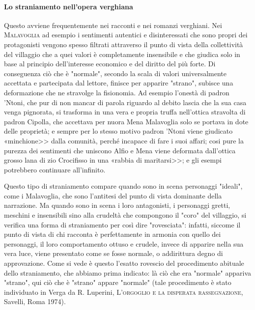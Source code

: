 \documentclass{book}
\newcounter{mar}
\begin{document}
\paragraph{Lo straniamento nell'opera verghiana} Questo avviene frequentemente nei racconti e nei romanzi verghiani. Nei \textsc{Malavoglia} ad esempio i sentimenti autentici e disinteressati che sono propri dei protagonisti vengono spesso filtrati attraverso il punto di vista della collettività del villaggio che a quei valori è completamente insensibile e che giudica solo in base al principio dell'interesse economico e del diritto del più forte. Di conseguenza ciò che è "normale", secondo la scala di valori universalmente accettata e partecipata dal lettore, finisce per apparire "strano", subisce una deformazione che ne stravolge la fisionomia. Ad esempio l'onestà di padron 'Ntoni, che pur di non mancar di parola riguardo al debito lascia che la sua casa venga pignorata, si trasforma in una vera e propria truffa nell'ottica stravolta di padron Cipolla, che accettava per nuora Mena Malavoglia solo se portava in dote delle proprietà; e sempre per lo stesso motivo padron 'Ntoni viene giudicato «minchione>> dalla comunità, perché incapace di fare i suoi affari; cosi pure la purezza dei sentimenti che uniscono Alfio e Mena viene deformata dall'ottica grosso lana di zio Crocifisso in una «rabbia di maritarsi>>; e gli esempi potrebbero continuare all'infinito.

Questo tipo di straniamento compare quando sono in scena personaggi "ideali", come i Malavoglia, che sono l'antitesi del punto di vista dominante della narrazione. Ma quando sono in scena i loro antagonisti, i personaggi gretti, meschini e insensibili sino alla crudeltà che compongono il "coro" del villaggio, si verifica una forma di straniamento per così dire "rovesciata": infatti, siccome il punto di vista di chi racconta è perfettamente in armonia con quello dei personaggi, il loro comportamento ottuso e crudele, invece di apparire nella sua vera luce, viene presentato come se fosse normale, o addirittura degno di approvazione. Come si vede è questo l'esatto rovescio del procedimento abituale dello straniamento, che abbiamo prima indicato: là ciò che era "normale" appariva "strano", qui ciò che è "strano" appare "normale" (tale procedimento è stato individuato in Verga da R. Luperini, \textsc{L'orgoglio e la disperata rassegnazione}, Savelli, Roma 1974).
\end{document}
